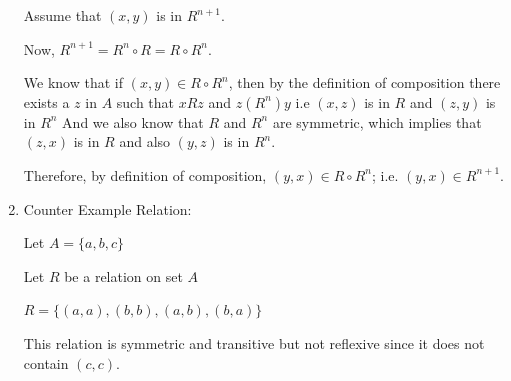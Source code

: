 \documentclass{../../cls/sig-alternate-05-2015}
\begin{document}
\begin{enumerate}
Assume that $(x,y)$ is in $R^{n+1}$.

Now, $R^{n+1}=R^n\circ R=R\circ R^n$.

We know that if $(x,y)\in R\circ R^n$, then by the definition of composition there
exists a $z$ in $A$ such that $xRz$ and $z(R^n)y$ i.e $(x,z)$ is in $R$ and $(z,y)$ is in $R
^n$ And we also know that $R$ and $R^n$ are symmetric, which implies that $(z,x)$ is
in $R$ and also $(y,z)$ is in $R^n$.

Therefore, by definition of composition, $(y,x)\in R\circ R^n$; i.e. $(y,x)\in R
^{n+1}$.

\item Counter Example Relation:

Let $A=\{a, b, c\}$

Let $R$ be a relation on set $A$

$R =\{(a, a), (b, b), (a, b), (b, a)\}$

This relation is symmetric and transitive but not reflexive since it does not
contain $(c,c)$.

\end{enumerate}
\end{document}
